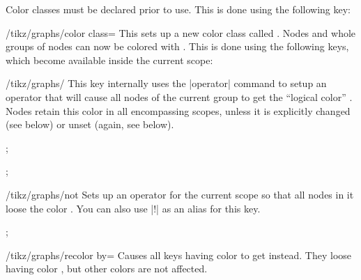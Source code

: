 Color classes must be declared prior to use. This is done using the
following key:
\begin{key}{/tikz/graphs/color class=}
  This sets up a new color class called . Nodes
  and whole groups of nodes can now be colored with . This is done using the following keys, which become
  available inside the current scope: 
  \begin{key}{/tikz/graphs/}
    This key internally uses the |operator| command to setup an
    operator that will cause all nodes of the current group to get the
    ``logical color'' . Nodes retain this color
    in all encompassing scopes, unless it is explicitly changed (see
    below) or unset (again, see below).
    \begin{codeexample}[]
\tikz {};
    \end{codeexample}
    \begin{codeexample}[]
\tikz {};
    \end{codeexample}
  \end{key}
  \begin{key}{/tikz/graphs/not }
    Sets up an operator for the current scope so that all nodes in it
    loose the color . You can also use
    |!| as an alias for this key.
    \begin{codeexample}[]
\tikz {};
    \end{codeexample}
  \end{key}
  \begin{key}{/tikz/graphs/recolor  by=}
    Causes all keys having color  to get
     instead. They loose having color , but other colors are not affected.
  \end{key}  
\end{key}




